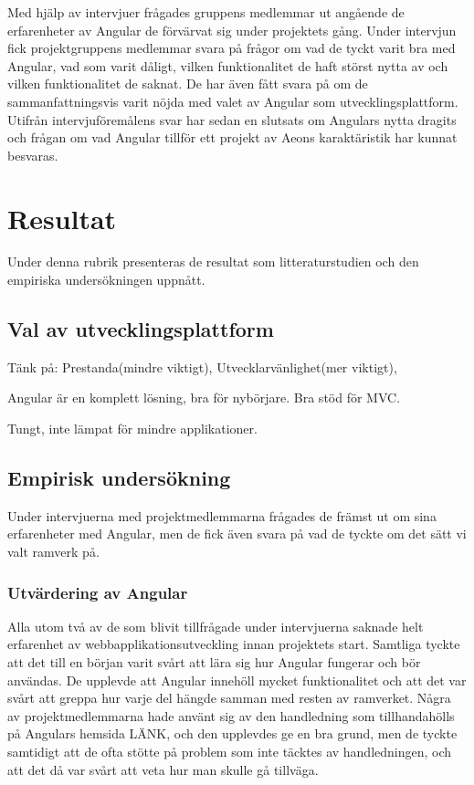 Med hjälp av intervjuer frågades gruppens medlemmar ut angående de erfarenheter av Angular de förvärvat sig under projektets gång. Under intervjun fick projektgruppens medlemmar svara på frågor om vad de tyckt varit bra med Angular, vad som varit dåligt, vilken funktionalitet de haft störst nytta av och vilken funktionalitet de saknat. De har även fått svara på om de sammanfattningsvis varit nöjda med valet av Angular som utvecklingsplattform. Utifrån intervjuföremålens svar har sedan en slutsats om Angulars nytta dragits och frågan om vad Angular tillför ett projekt av Aeons karaktäristik har kunnat besvaras.

\section{Resultat}

Under denna rubrik presenteras de resultat som litteraturstudien och den empiriska undersökningen uppnått.

\subsection{Val av utvecklingsplattform}

Tänk på: Prestanda(mindre viktigt), Utvecklarvänlighet(mer viktigt), 

Angular är en komplett lösning, bra för nybörjare. Bra stöd för MVC. 

Tungt, inte lämpat för mindre applikationer.

\subsection{Empirisk undersökning}

Under intervjuerna med projektmedlemmarna frågades de främst ut om sina erfarenheter med Angular, men de fick även svara på vad de tyckte om det sätt vi valt ramverk på. 

\subsubsection{Utvärdering av Angular}

Alla utom två av de som blivit tillfrågade under intervjuerna saknade helt erfarenhet av webbapplikationsutveckling innan projektets start. Samtliga tyckte att det till en början varit svårt att lära sig hur Angular fungerar och bör användas. De upplevde att Angular innehöll mycket funktionalitet och att det var svårt att greppa hur varje del hängde samman med resten av ramverket. Några av projektmedlemmarna hade använt sig av den handledning som tillhandahölls på Angulars hemsida LÄNK, och den upplevdes ge en bra grund, men de tyckte samtidigt att de ofta stötte på problem som inte täcktes av handledningen, och att det då var svårt att veta hur man skulle gå tillväga.


